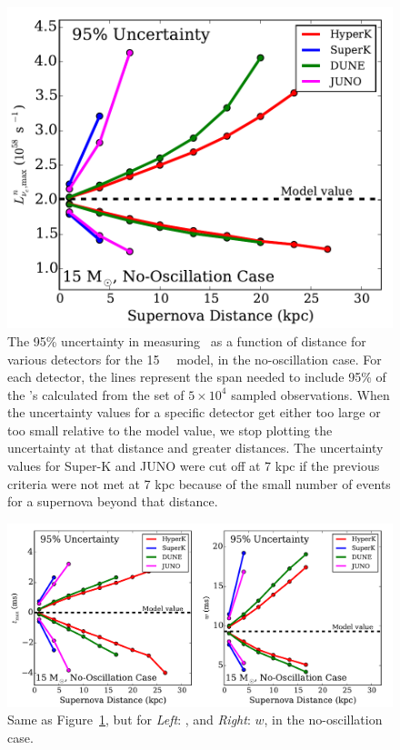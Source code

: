 \begin{figure}[h]
\centerline{\includegraphics[width=.6\linewidth]{wh07_15_40g_parametergroup_0_95_funcdistance.pdf}}
\caption{\label{fig:15maxvalfuncD} The 95\% uncertainty in measuring \lmax\ as a
  function of distance for various detectors for the 15
  \Msol\ \ls\ model, in the no-oscillation case. For each detector, the lines represent the span
  needed to include 95\% of the \lmax's calculated from the set of
  $5\times10^4$ 
  sampled observations. 
 When the uncertainty values for a
  specific detector get either
  too large or too small relative to the model value, we stop plotting
  the uncertainty at that distance and greater distances.  The uncertainty values for 
Super-K and JUNO were cut off
  at 7 kpc if the previous criteria were not met at 7 kpc because of
  the small number of events for a supernova beyond that
  distance.
}
\end{figure}


\begin{figure}[h]
\centerline{\includegraphics[width=\linewidth]{wh07_15_40g_parametergroup_1_95_funcdistance.pdf}}
\caption{\label{fig:15maxlocfwhmfuncD} Same as
  Figure~\ref{fig:15maxvalfuncD}, but for {\it Left}: \tmax, and {\it
    Right}: $w$, in the no-oscillation case.}
\end{figure}

